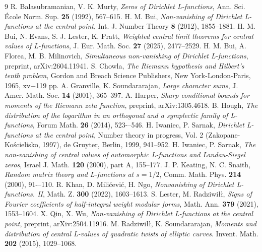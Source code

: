 \documentclass[12pt, reqno]{amsart}
\numberwithin{equation}{section}
\numberwithin{theorem}{section}
\numberwithin{equation}{section}
\begin{document}

\begin{thebibliography}{9}
\label{BM}
R. Balasubramanian, V. K. Murty, {\it Zeros of Dirichlet L-functions}, Ann. Sci. \'Ecole Norm. Sup. \textbf{25} (1992), 567--615.
\label{bui}
H. M. Bui, {\it Non-vanishing of Dirichlet L-functions at the central point}, Int. J. Number Theory \textbf{8} (2012), 1855--1881.
\label{BELP}
H. M. Bui, N. Evans, S. J. Lester, K. Pratt, {\it Weighted central limit theorems for central values of L-functions}, J. Eur. Math. Soc. \textbf{27} (2025), 2477--2529.
\label{BFM}
H. M. Bui, A. Florea, M. B. Milinovich, {\it Simultaneous non-vanishing of Dirichlet L-functions}, preprint, arXiv:2604.11941.
\label{chowla}
S. Chowla, {\it The Riemann hypothesis and Hilbert’s tenth problem}, Gordon and Breach Science Publishers, New York-London-Paris, 1965, xv+119 pp.
\label{gs}
A. Granville, K. Soundararajan, {\it Large character sums}, J. Amer. Math. Soc. \textbf{14} (2001), 365--397.
 \label{H}
A. Harper, {\it Sharp conditional bounds for moments of the Riemann zeta function}, preprint, arXiv:1305.4618.
\label{hough}
B. Hough, {\it The distribution of the logarithm in an orthogonal and a symplectic family of L-functions}, Forum Math. \textbf{26} (2014), 523-–546.
\label{IS1}
H. Iwaniec, P. Sarnak, {\it Dirichlet L-functions at the central point}, Number theory in progress, Vol. 2 (Zakopane-Ko\'scielisko, 1997), de Gruyter, Berlin, 1999, 941--952.
\label{IS2}
H. Iwaniec, P. Sarnak, {\it The non-vanishing of central values of automorphic L-functions and Landau-Siegel zeros}, Israel J. Math. \textbf{120} (2000), part A, 155--177.
\label{KS}
J. P. Keating, N. C. Snaith, {\it Random matrix theory and L-functions at $s=1/2$}, Comm. Math. Phys. \textbf{214} (2000), 91-–110.
\label{KMN}
R. Khan, D. Mili\'cevi\'c, H. Ngo, {\it Nonvanishing of Dirichlet L-functions. II}, Math. Z. \textbf{300} (2022), 1603--1613.
\label{LR}
S. Lester, M. Radziwi\l\l, {\it Signs of Fourier coefficients of half-integral weight modular forms}, Math. Ann. \textbf{379} (2021), 1553--1604.
\label{QW}
X. Qin, X. Wu, {\it Non-vanishing of Dirichlet L-functions at the central point}, preprint, arXiv:2504.11916.
\label{RS1}
M. Radziwi\l\l, K. Soundararajan, {\it Moments and distribution of central L-values of quadratic twists of elliptic curves}. Invent. Math. \textbf{202} (2015), 1029--1068.
\label{RS2}

\end{thebibliography}
\end{document}
